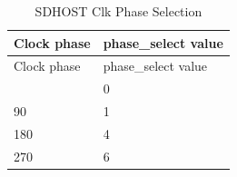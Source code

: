 \begin{longtable}[c]{ |p{2cm}|p{3cm}| }
\caption{SDHOST Clk Phase Selection} \label{tab:sdhost-clk-sel}\\
\hline
\rowcolor{lightgray}
Clock phase & phase\_select value \\
\hline
\endfirsthead
\hline
\rowcolor{lightgray}
Clock phase & phase\_select value  \\
\hline
\endhead
\endfoot
0 & 0 \\\hline
90 & 1 \\\hline
180 & 4 \\\hline
270 & 6 \\\hline
\end{longtable}
